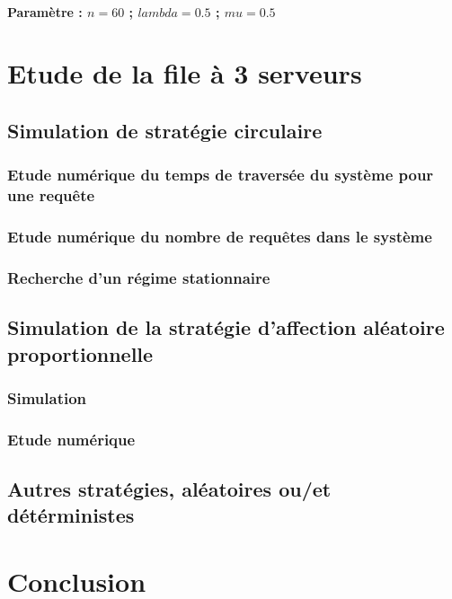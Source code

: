 \documentclass{article}
\begin{document}
\paragraph{Paramètre : $n=60$ ; $lambda=0.5$ ; $mu=0.5$}

\section{Etude de la file à 3 serveurs}

\subsection{Simulation de stratégie circulaire}
\subsubsection{Etude numérique du temps de traversée du système pour une requête}
\subsubsection{Etude numérique du nombre de requêtes dans le système}
\subsubsection{Recherche d'un régime stationnaire}

\subsection{Simulation de la stratégie d'affection aléatoire proportionnelle}
\subsubsection{Simulation}
\subsubsection{Etude numérique}

\subsection{Autres stratégies, aléatoires ou/et détérministes}

\section{Conclusion}
\paragraph{}

\newpage
\appendix

\section{}

\subsection{}
\begin{verbatim}
\end{verbatim}
\end{document}
